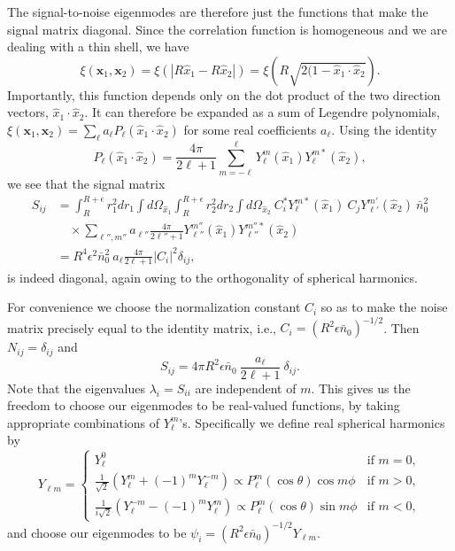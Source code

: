 \documentclass{article}
\renewcommand{\vec}[1]{\bm{#1}}
\newcommand{\nbar}{\bar{n}}
\begin{document}
The signal-to-noise eigenmodes are therefore just the functions that make the
signal matrix diagonal.  Since the correlation function is homogeneous and we
are dealing with a thin shell, we have
\begin{equation}
    \xi(\vec{x}_1,\vec{x}_2) = \xi(|R\hat{x}_1-R\hat{x}_2|) = \xi\left(R\sqrt{2(1-\hat{x}_1\cdot\hat{x}_2}\right).
\end{equation}
Importantly, this function depends only on the dot product of the two direction
vectors, $\hat{x}_1\cdot\hat{x}_2$.  It can therefore be expanded as a sum of
Legendre polynomials,
$\xi(\vec{x}_1,\vec{x}_2) = \sum_\ell a_\ell P_\ell(\hat{x}_1\cdot\hat{x}_2)$
for some real coefficients $a_\ell$.  Using the identity
\begin{equation}
    P_\ell(\hat{x}_1\cdot\hat{x}_2) = \frac{4\pi}{2\ell+1} \sum_{m=-\ell}^\ell Y_\ell^m(\hat{x}_1) Y_\ell^{m*}(\hat{x}_2),
\end{equation}
we see that the signal matrix
\begin{align}
    S_{ij} &= \int_R^{R+\epsilon} r_1^2 dr_1 \int d\Omega_{\hat{x}_1} \int_R^{R+\epsilon} r_2^2 dr_2 \int d\Omega_{\hat{x}_2} ~ C_i^* Y_\ell^{m*}(\hat{x}_1) ~ C_j Y_{\ell'}^{m'}(\hat{x}_2) ~ \nbar_0^2 \\
           &\quad \times \sum_{\ell'',m''} a_{\ell''} \frac{4\pi}{2\ell''+1} Y_{\ell''}^{m''}(\hat{x}_1) Y_{\ell''}^{m''*}(\hat{x}_2) \\
           &= R^4 \epsilon^2 \nbar_0^2 ~ a_\ell \frac{4\pi}{2\ell+1} |C_i|^2 \delta_{ij},
\end{align}
is indeed diagonal, again owing to the orthogonality of spherical harmonics.

For convenience we choose the normalization constant $C_i$ so as to make the
noise matrix precisely equal to the identity matrix, i.e.,
$C_i = (R^2 \epsilon \nbar_0)^{-1/2}$.  Then $N_{ij} = \delta_{ij}$ and
\begin{equation}
    S_{ij} = 4\pi R^2 \epsilon \nbar_0 ~ \frac{a_\ell}{2\ell+1} ~ \delta_{ij}.
\end{equation}
Note that the eigenvalues $\lambda_i = S_{ii}$ are independent of $m$.  This
gives us the freedom to choose our eigenmodes to be real-valued functions, by
taking appropriate combinations of $Y_\ell^m$'s.  Specifically we define real
spherical harmonics by
\begin{equation}
    Y_{\ell m} =
    \begin{cases}
        Y_\ell^0 & \text{if } m = 0, \\
        \frac{1}{\sqrt{2}} (Y_\ell^m + (-1)^m Y_\ell^{-m}) \propto P_\ell^m(\cos\theta) \cos m\phi & \text{if } m > 0, \\
        \frac{1}{i\sqrt{2}} (Y_\ell^{-m} - (-1)^m Y_\ell^m) \propto P_\ell^m(\cos\theta) \sin m\phi & \text{if } m < 0,
    \end{cases}
\end{equation}
and choose our eigenmodes to be $\psi_i = (R^2\epsilon \nbar_0)^{-1/2} Y_{\ell m}$.
\end{document}
